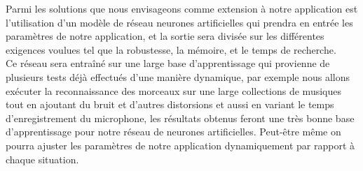 \documentclass[10pt, english]{report}
\begin{document}
Parmi les solutions que nous envisageons comme extension à notre application est l'utilisation d'un modèle de réseau neurones artificielles qui prendra en entrée les paramètres de notre application, et la sortie sera divisée sur les différentes exigences voulues tel que la robustesse, la mémoire, et le temps de recherche.\\

Ce réseau sera entraîné sur une large base d'apprentissage qui provienne de plusieurs tests déjà effectués d'une manière dynamique, par exemple nous allons exécuter la reconnaissance des morceaux sur une large collections de musiques tout en ajoutant du bruit et d'autres distorsions et aussi en variant le temps d'enregistrement du microphone, les résultats obtenus feront une très bonne base d'apprentissage pour notre réseau de neurones artificielles. Peut-être même on pourra ajuster les paramètres de notre application dynamiquement par rapport à chaque situation.\\
\end{document}
